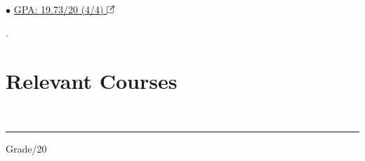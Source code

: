 \documentclass[]{rahulworld-resume}
\begin{document}
\begin{minipage}[t]{0.36\textwidth}
\begin{minipage}{\linewidth}
{\begin{minipage}[t]{6.27cm}
					\\
					\small $\bullet$ \href{https://behzadshayegh.github.io/CV/BCsCSreport.pdf}{GPA: 19.73/20 (4/4) \includegraphics[width=8pt]{icons/redirect.png}}\\
				\end{minipage}.
		}
	\end{minipage}
	\sectionsep

	\section{Relevant Courses}\vspace{-4pt}{\normalsize\normalfont * indicates graduate courses.}\vspace{-8pt}\\
	\noindent\rule{0.75\textwidth}{0.4pt}\hfill Grade/20


\end{minipage}
\end{document}
